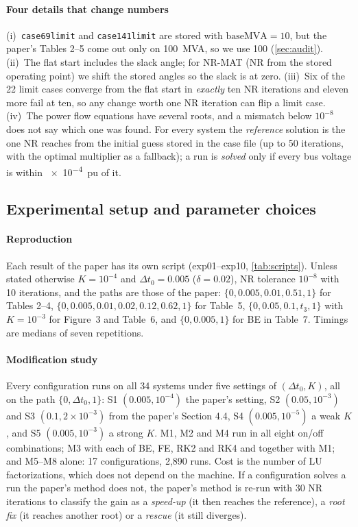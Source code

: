 \documentclass[sigconf,nonacm]{acmart}
\newcommand{\code}[1]{\texttt{#1}}
\begin{document}
\paragraph{Four details that change numbers}
(i)~\code{case69limit} and \code{case141limit} are stored with $\text{baseMVA}=10$, but the paper's Tables
2--5 come out only on \SI{100}{MVA}, so we use 100 (\cref{sec:audit}). (ii)~The flat start includes the
slack angle; for NR-MAT (NR from the stored operating point) we shift the stored angles so the slack is at
zero. (iii)~Six of the 22 limit cases converge from the flat start in \emph{exactly} ten NR iterations and
eleven more fail at ten, so any change worth one NR iteration can flip a limit case. (iv)~The power flow
equations have several roots, and a mismatch below $10^{-8}$ does not say which one was found. For every
system the \emph{reference} solution is the one NR reaches from the initial guess stored in the case file
(up to 50 iterations, with the optimal multiplier as a fallback); a run is \emph{solved} only if every bus
voltage is within \SI{e-4}{pu} of it.

\subsection{Experimental setup and parameter choices}
\paragraph{Reproduction} Each result of the paper has its own script (exp01--exp10,
\cref{tab:scripts}). Unless stated otherwise $K=10^{-4}$ and $\Delta t_0=0.005$ ($\delta=0.02$), NR
tolerance $10^{-8}$ with 10 iterations, and the paths are those of the paper: $\{0,0.005,0.01,0.51,1\}$ for
Tables 2--4, $\{0,0.005,0.01,0.02,0.12,0.62,1\}$ for Table~5, $\{0,0.05,0.1,t_3,1\}$ with $K=10^{-3}$ for
Figure~3 and Table~6, and $\{0,0.005,1\}$ for BE in Table~7. Timings are medians of seven repetitions.

\paragraph{Modification study} Every configuration runs on all 34 systems under five settings of
$(\Delta t_0,K)$, all on the path $\{0,\Delta t_0,1\}$: S1 $(0.005,10^{-4})$ the paper's setting,
S2 $(0.05,10^{-3})$ and S3 $(0.1,2\times10^{-3})$ from the paper's Section 4.4, S4 $(0.005,10^{-5})$ a weak
$K$, and S5 $(0.005,10^{-3})$ a strong $K$. M1, M2 and M4 run in all eight on/off combinations; M3 with each
of BE, FE, RK2 and RK4 and together with M1; and M5--M8 alone: 17 configurations, 2{,}890 runs. Cost is the
number of LU factorizations, which does not depend on the machine. If a configuration solves a run the
paper's method does not, the paper's method is re-run with 30 NR iterations to classify the gain as a
\emph{speed-up} (it then reaches the reference), a \emph{root fix} (it reaches another root) or a
\emph{rescue} (it still diverges).
\end{document}

